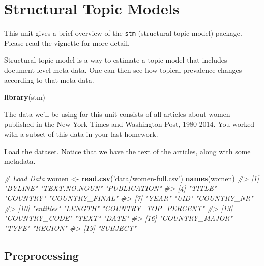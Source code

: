\documentclass[]{book}
\newenvironment{Shaded}{\begin{snugshade}}{\end{snugshade}}
\newcommand{\CommentTok}[1]{\textcolor[rgb]{0.56,0.35,0.01}{\textit{#1}}}
\newcommand{\KeywordTok}[1]{\textcolor[rgb]{0.13,0.29,0.53}{\textbf{#1}}}
\newcommand{\NormalTok}[1]{#1}
\newcommand{\StringTok}[1]{\textcolor[rgb]{0.31,0.60,0.02}{#1}}
\begin{document}
\hypertarget{structural-topic-models}{%
\section{Structural Topic Models}\label{structural-topic-models}}

This unit gives a brief overview of the \texttt{stm} (structural topic model) package. Please read the vignette for more detail.

Structural topic model is a way to estimate a topic model that includes document-level meta-data. One can then see how topical prevalence changes according to that meta-data.

\begin{Shaded}
\begin{Highlighting}[]
\KeywordTok{library}\NormalTok{(stm)}
\end{Highlighting}
\end{Shaded}

The data we'll be using for this unit consists of all articles about women published in the New York Times and Washington Post, 1980-2014. You worked with a subset of this data in your last homework.

Load the dataset. Notice that we have the text of the articles, along with some metadata.

\begin{Shaded}
\begin{Highlighting}[]
\CommentTok{# Load Data}
\NormalTok{women <-}\StringTok{ }\KeywordTok{read.csv}\NormalTok{(}\StringTok{'data/women-full.csv'}\NormalTok{)}
\KeywordTok{names}\NormalTok{(women)}
\CommentTok{#>  [1] "BYLINE"              "TEXT.NO.NOUN"        "PUBLICATION"        }
\CommentTok{#>  [4] "TITLE"               "COUNTRY"             "COUNTRY_FINAL"      }
\CommentTok{#>  [7] "YEAR"                "UID"                 "COUNTRY_NR"         }
\CommentTok{#> [10] "entities"            "LENGTH"              "COUNTRY_TOP_PERCENT"}
\CommentTok{#> [13] "COUNTRY_CODE"        "TEXT"                "DATE"               }
\CommentTok{#> [16] "COUNTRY_MAJOR"       "TYPE"                "REGION"             }
\CommentTok{#> [19] "SUBJECT"}
\end{Highlighting}
\end{Shaded}

\hypertarget{preprocessing-1}{%
\subsection{Preprocessing}\label{preprocessing-1}}
\end{document}
